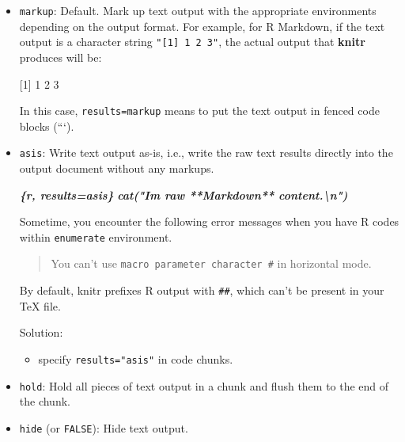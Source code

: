 \documentclass[
]{book}
\newenvironment{Shaded}{\begin{snugshade}}{\end{snugshade}}
\newcommand{\AttributeTok}[1]{\textcolor[rgb]{0.13,0.29,0.53}{#1}}
\newcommand{\InformationTok}[1]{\textcolor[rgb]{0.56,0.35,0.01}{\textbf{\textit{#1}}}}
\newcommand{\StringTok}[1]{\textcolor[rgb]{0.31,0.60,0.02}{#1}}
\providecommand{\tightlist}{%
  \setlength{\itemsep}{0pt}\setlength{\parskip}{0pt}}
\begin{document}
\begin{itemize}
\item
  \texttt{markup}: Default. Mark up text output with the appropriate environments depending on the output format. For example, for R Markdown, if the text output is a character string \texttt{"{[}1{]}\ 1\ 2\ 3"}, the actual output that \textbf{knitr} produces will be:

\begin{Shaded}
\begin{Highlighting}[]
\StringTok{\textasciigrave{}\textasciigrave{}\textasciigrave{}}
\AttributeTok{[1] 1 2 3}
\StringTok{\textasciigrave{}\textasciigrave{}\textasciigrave{}}
\end{Highlighting}
\end{Shaded}

  In this case, \texttt{results=\textquotesingle{}markup\textquotesingle{}} means to put the text output in fenced code blocks (```).
\item
  \texttt{asis}: Write text output as-is, i.e., write the raw text results directly into the output document without any markups.

\begin{Shaded}
\begin{Highlighting}[]
\InformationTok{\textasciigrave{}\textasciigrave{}\textasciigrave{}\{r, results=\textquotesingle{}asis\textquotesingle{}\}}
\InformationTok{cat("I\textquotesingle{}m raw **Markdown** content.\textbackslash{}n")}
\InformationTok{\textasciigrave{}\textasciigrave{}\textasciigrave{}}
\end{Highlighting}
\end{Shaded}

  Sometime, you encounter the following error messages when you have R codes within \texttt{enumerate} environment.

  \begin{quote}
  You can't use \texttt{macro\ parameter\ character\ \#} in horizontal mode.
  \end{quote}

  By default, knitr prefixes R output with \texttt{\#\#}, which can't be present in your TeX file.

  Solution:

  \begin{itemize}
  \tightlist
  \item
    specify \texttt{results="asis"} in code chunks.
  \end{itemize}
\item
  \texttt{hold}: Hold all pieces of text output in a chunk and flush them to the end of the chunk.
\item
  \texttt{hide} (or \texttt{FALSE}): Hide text output.
\end{itemize}
\end{document}
